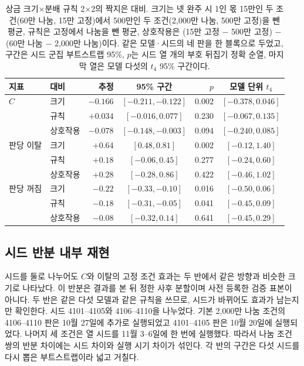 \begin{table}[t]
\centering
\caption{상금 크기$\times$분배 규칙 2$\times$2의 짝지은 대비. 크기는 넷 완주 시 1인 몫 15만인 두 조건(60만 나눔, 15만 고정)에서 500만인 두 조건(2,000만 나눔, 500만 고정)을 뺀 평균, 규칙은 고정에서 나눔을 뺀 평균, 상호작용은 (15만 고정 $-$ 500만 고정) $-$ (60만 나눔 $-$ 2,000만 나눔)이다. 같은 모델·시드의 네 판을 한 블록으로 두었고, 구간은 시드 군집 부트스트랩 95\%, $p$는 시드 열 개의 부호 뒤집기 정확 순열, 마지막 열은 모델 다섯의 $t_4$ 95\% 구간이다.}
\label{val:w3-tab-fac}
\small
\setlength{\tabcolsep}{4pt}
\begin{tabular}{llrcrc}
\toprule
지표 & 대비 & 추정 & 95\% 구간 & $p$ & 모델 단위 $t_4$ \\
\midrule
$C$ & 크기 & $-0.166$ & $[-0.211, -0.122]$ & 0.002 & $[-0.378, 0.046]$ \\
 & 규칙 & $+0.034$ & $[-0.016, 0.077]$ & 0.230 & $[-0.067, 0.135]$ \\
 & 상호작용 & $-0.078$ & $[-0.148, -0.003]$ & 0.094 & $[-0.240, 0.085]$ \\
\midrule
판당 이탈 & 크기 & $+0.64$ & $[0.48, 0.81]$ & 0.002 & $[-0.12, 1.40]$ \\
 & 규칙 & $+0.18$ & $[-0.06, 0.45]$ & 0.277 & $[-0.24, 0.60]$ \\
 & 상호작용 & $+0.28$ & $[-0.28, 0.86]$ & 0.422 & $[-0.46, 1.02]$ \\
\midrule
판당 꺼짐 & 크기 & $-0.22$ & $[-0.33, -0.10]$ & 0.016 & $[-0.50, 0.06]$ \\
 & 규칙 & $-0.18$ & $[-0.31, -0.05]$ & 0.041 & $[-0.45, 0.09]$ \\
 & 상호작용 & $-0.08$ & $[-0.32, 0.14]$ & 0.641 & $[-0.45, 0.29]$ \\
\bottomrule
\end{tabular}
\end{table}

\subsection{시드 반분 내부 재현}\label{val:w3-split}

시드를 둘로 나누어도 $C$와 이탈의 고정 조건 효과는 두 반에서 같은 방향과 비슷한 크기로 나타났다. 이 반분은 결과를 본 뒤 정한 사후 분할이며 사전 등록한 검증 표본이 아니다. 두 반은 같은 다섯 모델과 같은 규칙을 쓰므로, 시드가 바뀌어도 효과가 남는지만 확인한다. 시드 4101--4105와 4106--4110을 나누었다. 기본 2,000만 나눔 조건의 4106--4110 판은 10월 27일에 추가로 실행되었고 4101--4105 판은 10월 20일에 실행되었다. 나머지 세 조건은 열 시드를 11월 3--6일에 한 번에 실행했다. 따라서 나눔 조건 쌍의 반분 차이에는 시드 차이와 실행 시기 차이가 섞인다. 각 반의 구간은 다섯 시드를 다시 뽑은 부트스트랩이라 넓고 거칠다.

